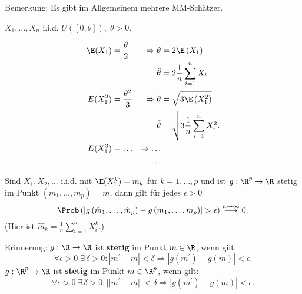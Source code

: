 \documentclass{tstextbook}
\begin{document}
\begin{remark}
	Bemerkung: Es gibt im Allgemeinem mehrere MM-Schätzer.
\end{remark}

\begin{example}[Gleichverteilung]
	$ X_1, \ldots, X_n $ i.i.d. $ U([0,\theta]), \; \theta > 0 $.
	
	\[
	\begin{aligned}
		\E(X_1) &= \frac{\theta}{2} & \Rightarrow \theta & = 2\E\left(X_1\right) \\
		& & \hat{\theta} & = 2 \frac{1}{n} \sum_{i=1}^{n} X_i. \\
		E(X_1^2) &= \frac{\theta^2}{3} & \Rightarrow \theta & = \sqrt{3\E\left(X_1^2\right)} \\
		& & \tilde{\theta} & = \sqrt{3\frac{1}{n} \sum_{i=1}^{n} X_i^2}. \\
		E(X_1^3) &= \ldots & \Rightarrow \ldots \\
		& & \ldots
	\end{aligned}
	\]
	
\end{example}


\begin{lemma}
	\label{lemma_stetig}
	Sind $ X_1,X_2,\ldots $ i.i.d. mit $ \E(X_1^k) = m_k $ für $ k = 1,\ldots, p $ und ist $ g:\R^p \rightarrow \R $ stetig im Punkt $ \left(m_1, \ldots, m_p \right) = m $, dann gilt für jedes $ \epsilon > 0 $
	\[
	\Prob\left(\left|g\left(\hat{m}_1,\ldots,\hat{m}_p\right)-g\left(m_1,\ldots,m_p\right)\right| > \epsilon \right) \overset{n\to\infty}{\longrightarrow} 0.
	\]
	(Hier ist $ \hat{m}_k = \frac{1}{n} \sum_{i=1}^{n} X_i^k $.)
\end{lemma}


\begin{remark}
	Erinnerung:
	$ g: \R \rightarrow \R $ ist \textbf{stetig} im Punkt $ m \in \R $, wenn gilt: 
	\[ \forall \epsilon > 0 \; \exists \, \delta >0 \colon |m^\prime - m| < \delta \Rightarrow |g(m^\prime) - g(m)| < \epsilon. \]
	$ g: \R^p \rightarrow \R $ ist \textbf{stetig} im Punkt $ m \in \R^p $, wenn gilt: 
	\[ \forall \epsilon > 0 \; \exists \, \delta >0 \colon ||m^\prime - m|| < \delta \Rightarrow |g(m^\prime) - g(m)| < \epsilon. \]
\end{remark}
\end{document}
